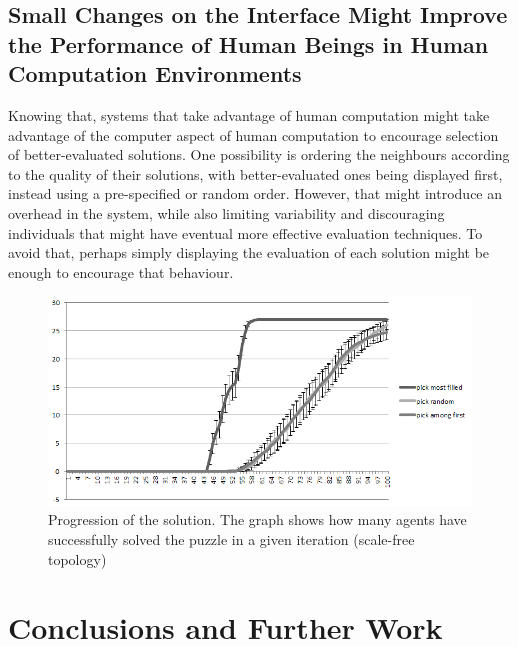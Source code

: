 \documentclass{article}
\begin{document}
\subsection{Small Changes on the Interface Might Improve the Performance of Human Beings in Human Computation Environments}

Knowing that, systems that take advantage of human computation might take advantage of the computer aspect of human computation to encourage selection of better-evaluated solutions. One possibility is ordering the neighbours according to the quality of their solutions, with better-evaluated ones being displayed first, instead using a pre-specified or random order. However, that might introduce an overhead in the system, while also limiting variability and discouraging individuals that might have eventual more effective evaluation techniques. To avoid that, perhaps simply displaying the evaluation of each solution might be enough to encourage that behaviour.

\begin{figure}
\includegraphics[scale=0.45]{progression}
\caption{Progression of the solution. The graph shows how many agents have successfully solved the puzzle in a given iteration (scale-free topology)
}
\label{fig:progression}
\end{figure}

\section{Conclusions and Further Work}
\end{document}
